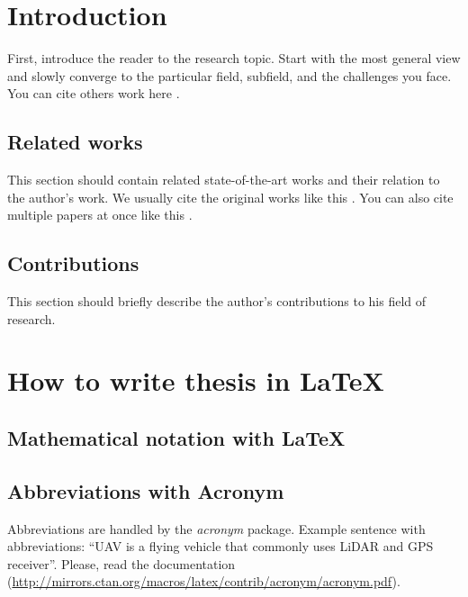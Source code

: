 \chapter{Introduction}

First, introduce the reader to the research topic.
Start with the most general view and slowly converge to the particular field, subfield, and the challenges you face.
You can cite others work here \cite{baca2020mrs}.


\section{Related works}

This section should contain related state-of-the-art works and their relation to the author's work.
We usually cite the original works like this \cite{benallegue2008high}.
You can also cite multiple papers at once like this \cite{baca2016embedded, baca2020mrs}.

\section{Contributions}

This section should briefly describe the author's contributions to his field of research.


\chapter{How to write thesis in LaTeX}

\section{Mathematical notation with LaTeX}

\section{Abbreviations with Acronym}

Abbreviations are handled by the \emph{acronym} package.
Example sentence with abbreviations: ``\ac{UAV} is a flying vehicle that commonly uses \ac{LiDAR} and \ac{GPS} receiver''.
Please, read the documentation (\url{http://mirrors.ctan.org/macros/latex/contrib/acronym/acronym.pdf}).

